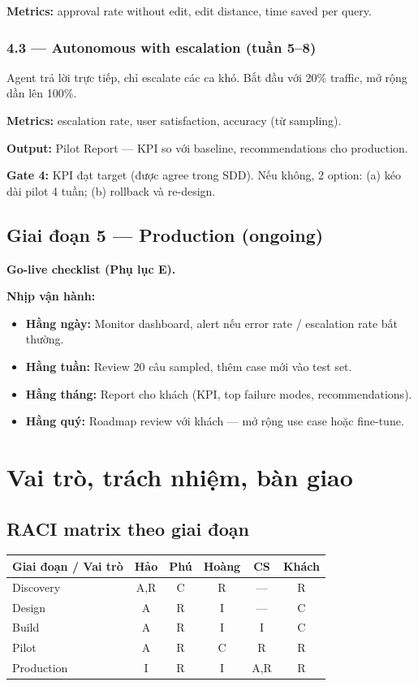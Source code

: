 \documentclass[11pt,a4paper]{article}
\begin{document}
\textbf{Metrics:} approval rate without edit, edit distance, time saved per query.

\subsubsection*{4.3 --- Autonomous with escalation (tuần 5--8)}

Agent trả lời trực tiếp, chỉ escalate các ca khó. Bắt đầu với 20\% traffic, mở
rộng dần lên 100\%.

\textbf{Metrics:} escalation rate, user satisfaction, accuracy (từ sampling).

\textbf{Output:} Pilot Report --- KPI so với baseline, recommendations cho production.

\textbf{Gate 4:} KPI đạt target (được agree trong SDD). Nếu không, 2 option: (a) kéo dài pilot 4 tuần; (b) rollback và re-design.

\subsection{Giai đoạn 5 — Production (ongoing)}

\textbf{Go-live checklist (Phụ lục E).}

\textbf{Nhịp vận hành:}
\begin{itemize}
\item \textbf{Hằng ngày:} Monitor dashboard, alert nếu error rate / escalation rate bất thường.
\item \textbf{Hằng tuần:} Review 20 câu sampled, thêm case mới vào test set.
\item \textbf{Hằng tháng:} Report cho khách (KPI, top failure modes, recommendations).
\item \textbf{Hằng quý:} Roadmap review với khách --- mở rộng use case hoặc fine-tune.
\end{itemize}

\clearpage

\section{Vai trò, trách nhiệm, bàn giao}

\subsection{RACI matrix theo giai đoạn}

\begin{tabularx}{\linewidth}{@{}p{2.8cm} c c c c c@{}}
\toprule
\textbf{Giai đoạn / Vai trò} & \textbf{Hảo} & \textbf{Phú} & \textbf{Hoàng} & \textbf{CS} & \textbf{Khách} \\
\midrule
Discovery & A,R & C & R & --- & R \\
Design & A & R & I & --- & C \\
Build & A & R & I & I & C \\
Pilot & A & R & C & R & R \\
Production & I & R & I & A,R & R \\
\bottomrule
\end{tabularx}
\end{document}
